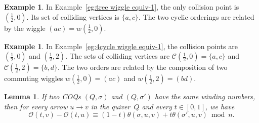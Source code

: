 \documentclass[11pt, letterpaper]{amsart}
\newtheorem{lemma}[theorem]{Lemma}
\theoremstyle{definition}
\newtheorem{example}[theorem]{Example}
\numberwithin{equation}{section}
\def\O{{\mathcal{O}}}
\begin{document}

\begin{example}
\label{eg:tree wiggle equiv-2}
In Example~\ref{eg:tree wiggle equiv-1}, the only collision point is $(\frac{1}{2}, 0)$. 
Its set of colliding vertices is $\{a,c\}$. 
The two cyclic orderings are related by the wiggle $(a c)=w(\frac12,0)$.
\end{example}

\begin{example}
\label{eg:4cycle wiggle equiv-2}
In Example~\ref{eg:4cycle wiggle equiv-1}, the collision points are $(\frac{1}{2},0)$ and $(\frac{1}{2},2)$. 
The sets of colliding vertices are $\mathcal{C}(\frac{1}{2}, 0) = \{a,c\}$ and $\mathcal{C}(\frac{1}{2},2)=\{b,d\}$.
The two orders are related by the composition of two commuting wiggles $w(\frac{1}{2}, 0) = (a c)$ 
and $w(\frac{1}{2}, 2) = (b d)$. 
\end{example}

\pagebreak[3]

\begin{lemma}
\label{lem:w works for all edges}
If two COQs $(Q, \sigma)$ and $(Q, \sigma')$ have the same winding numbers,
then for every arrow $u \rightarrow v$ in the quiver~$Q$ 
and every $t\in [0,1]$, we have 
\begin{equation*}
\O(t,v)-\O(t,u)
\equiv (1-t) \theta(\sigma,u,v) + t \theta(\sigma',u,v) \bmod n.
\end{equation*}
\end{lemma}
\end{document}
